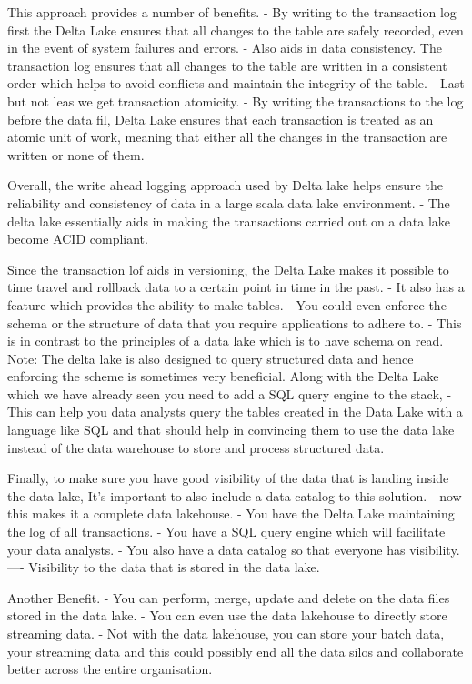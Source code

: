 \documentclass[a4paper, 11pt]{article}
\begin{document}
    This approach provides a number of benefits.
    - By writing to the transaction log first the Delta Lake ensures that all changes to the table are safely recorded, even in the event of system failures and errors.
    - Also aids in data consistency.
    The transaction log ensures that all changes to the table are written in a consistent order which helps to avoid conflicts and maintain the integrity of the table.
    - Last but not leas we get transaction atomicity.
    - By writing the transactions to the log before the data fil, Delta Lake ensures that each transaction is treated as an atomic unit of work, meaning that either all the changes in the transaction are written or none of them.

    Overall, the write ahead logging approach used by Delta lake helps ensure the reliability and consistency of data in a large scala data lake environment.
    - The delta lake essentially aids in making the transactions carried out on a data lake become ACID compliant.

    Since the transaction lof aids in versioning, the Delta Lake makes it possible to time travel and rollback data to a certain point in time in the past.
    - It also has a feature which provides the ability to make tables.
    - You could even enforce the schema or the structure of data that you require applications to adhere to.
    - This is in contrast to the principles of a data lake which is to have schema on read.
    Note: The delta lake is also designed to query structured data and hence enforcing the scheme is sometimes very beneficial.
    Along with the Delta Lake which we have already seen you need to add a SQL query engine to the stack,
    - This can help you data analysts query the tables created in the Data Lake with a language like SQL and that should help in convincing them to use the data lake instead of the data warehouse to store and process structured data.

    Finally, to make sure you have good visibility of the data that is landing inside the data lake, It's important to also include a data catalog to this solution.
    - now this makes it a complete data lakehouse.
    - You have the Delta Lake maintaining the log of all transactions.
    - You have a SQL query engine which will facilitate your data analysts.
    - You also have a data catalog so that everyone has visibility.
    ---- Visibility to the data that is stored in the data lake.

    Another Benefit.
    - You can perform, merge, update and delete on the data files stored in the data lake.
    - You can even use the data lakehouse to directly store streaming data.
    - Not with the data lakehouse, you can store your batch data, your streaming data and this could possibly end all the data silos and collaborate better across the entire organisation.
\end{document}

